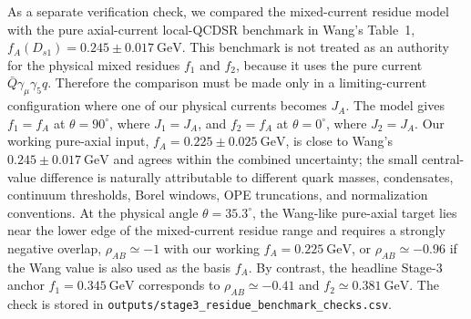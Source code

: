\documentclass[11pt]{article}
\newcommand{\GeV}{\mathrm{GeV}}
\begin{document}
As a separate verification check, we compared the mixed-current residue model
with the pure axial-current local-QCDSR benchmark in Wang's Table~1,
$f_A(D_{s1})=0.245\pm0.017~\GeV$.  This benchmark is not treated as an
authority for the physical mixed residues $f_1$ and $f_2$, because it uses the
pure current $\bar Q\gamma_\mu\gamma_5 q$.  Therefore the comparison must be
made only in a limiting-current configuration where one of our physical
currents becomes $J_A$.  The model gives $f_1=f_A$ at $\theta=90^\circ$, where
$J_1=J_A$, and $f_2=f_A$ at $\theta=0^\circ$, where $J_2=J_A$.  Our working
pure-axial input, $f_A=0.225\pm0.025~\GeV$, is close to Wang's
$0.245\pm0.017~\GeV$ and agrees within the combined uncertainty; the small
central-value difference is naturally attributable to different quark masses,
condensates, continuum thresholds, Borel windows, OPE truncations, and
normalization conventions.  At the physical angle $\theta=35.3^\circ$, the
Wang-like pure-axial target lies near the lower edge of the mixed-current
residue range and requires a strongly negative overlap,
$\rho_{AB}\simeq-1$ with our working $f_A=0.225~\GeV$, or
$\rho_{AB}\simeq-0.96$ if the Wang value is also used as the basis $f_A$.  By
contrast, the headline Stage-3 anchor $f_1=0.345~\GeV$ corresponds to
$\rho_{AB}\simeq-0.41$ and $f_2\simeq0.381~\GeV$.  The check is stored in
\texttt{outputs/stage3\_residue\_benchmark\_checks.csv}.
\end{document}
